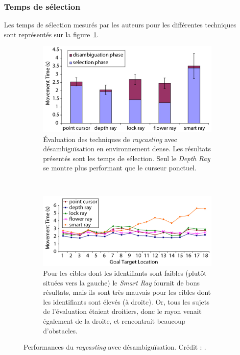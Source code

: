 	\subsubsection{Temps de sélection}
	
	Les temps de sélection mesurés par les auteurs pour les différentes techniques sont représentés sur la figure~\ref{fig:rayTimes}.
	
	\begin{figure}[!htb]
		\begin{subfigure}[t]{0.49\textwidth}
			\centering
			\includegraphics[width=\textwidth]{figures/ch2/rayTimes}
			\caption{Évaluation des techniques de \emph{raycasting} avec désambiguïsation en environnement dense. Les résultats présentés sont les temps de sélection. Seul le \emph{Depth Ray} se montre plus performant que le curseur ponctuel.}
			\label{fig:rayTimes}
		\end{subfigure}
		~
		\begin{subfigure}[t]{0.49\textwidth}
			\centering
			\includegraphics[width=\textwidth]{figures/ch2/smartRayLocation}
			\caption{Pour les cibles dont les identifiants sont faibles (plutôt situées vers la gauche) le \emph{Smart Ray} fournit de bons résultats, mais ils sont très mauvais pour les cibles dont les identifiants sont élevés (à droite). Or, tous les sujets de l'évaluation étaient droitiers, donc le rayon venait également de la droite, et rencontrait beaucoup d'obstacles.}
			\label{fig:smartRayLocation}
		\end{subfigure}
		\caption[Performances du \emph{raycasting} avec désambiguïsation]{Performances du \emph{raycasting} avec désambiguïsation. Crédit : \cite{grossman2006design}.}
		\label{fig:rayPerf}
	\end{figure}

